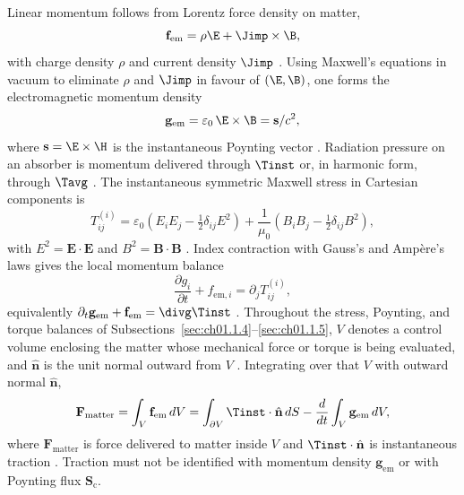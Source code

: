 Linear momentum follows from Lorentz force density on matter,
\begin{equation}
\label{eq:ch1.lorentz-force}
\mathbf{f}_{\mathrm{em}}=\rho\E+\Jimp\times\B,
\end{equation}
with charge density $\rho$ and current density $\Jimp$ \cite{maxwell1873,stratton1941}.
Using Maxwell's equations in vacuum to eliminate $\rho$ and $\Jimp$ in favour of $(\E,\B)$,
one forms the electromagnetic momentum density
\begin{equation}
\label{eq:ch1.momentum-density-instantaneous}
\mathbf{g}_{\mathrm{em}}=\varepsilon_0\,\E\times\B
=\mathbf{s}/c^2,
\end{equation}
where $\mathbf{s}=\E\times\H$ is the instantaneous Poynting vector \cite{maxwell1873,poynting1884}.
Radiation pressure on an absorber is momentum delivered through $\Tinst$ or, in harmonic form, through $\Tavg$ \cite{maxwell1873,stratton1941}. The instantaneous symmetric Maxwell stress in Cartesian components is
\begin{equation}
\label{eq:ch1.maxwell-stress-components}
T^{(i)}_{ij}=\varepsilon_0\!\left(E_iE_j-\tfrac12\delta_{ij}E^2\right)
+\frac{1}{\mu_0}\!\left(B_iB_j-\tfrac12\delta_{ij}B^2\right),
\end{equation}
with $E^2=\mathbf{E}\cdot\mathbf{E}$ and $B^2=\mathbf{B}\cdot\mathbf{B}$ \cite{maxwell1873,stratton1941}.
Index contraction with Gauss's and Amp\`ere's laws gives the local momentum balance
\begin{equation}
\label{eq:ch1.momentum-balance-instantaneous}
\frac{\partial g_{i}}{\partial t}+f_{\mathrm{em},i}=\partial_j T^{(i)}_{ij},
\end{equation}
equivalently $\partial_t\mathbf{g}_{\mathrm{em}}+\mathbf{f}_{\mathrm{em}}=\divg\Tinst$ \cite{maxwell1873,jackson1999}.
Throughout the stress, Poynting, and torque balances of
Subsections~\ref{sec:ch01.1.4}--\ref{sec:ch01.1.5}, $V$ denotes a control volume
enclosing the matter whose mechanical force or torque is being evaluated, and
$\hat{\mathbf{n}}$ is the unit normal outward from $V$ \cite{stratton1941}.
Integrating over that $V$ with outward normal $\hat{\mathbf{n}}$,
\begin{equation}
\label{eq:ch1.momentum-integral-balance}
\mathbf{F}_{\mathrm{matter}}
=\int_V \mathbf{f}_{\mathrm{em}}\,dV
=\int_{\partial V}\Tinst\cdot\hat{\mathbf{n}}\,dS
-\frac{d}{dt}\int_V \mathbf{g}_{\mathrm{em}}\,dV,
\end{equation}
where $\mathbf{F}_{\mathrm{matter}}$ is force delivered to matter inside $V$ and $\Tinst\cdot\hat{\mathbf{n}}$ is instantaneous traction \cite{stratton1941}. Traction must not be identified with momentum density $\mathbf{g}_{\mathrm{em}}$ or with Poynting flux $\mathbf{S}_\mathrm{c}$.

